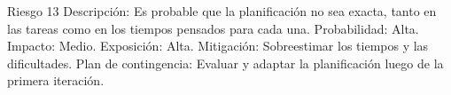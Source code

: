 Riesgo 13
Descripción: Es probable que la planificación no sea exacta, tanto en las tareas como en los tiempos pensados para cada una.
Probabilidad: Alta.
Impacto: Medio.
Exposición: Alta.
Mitigación: Sobreestimar los tiempos y las dificultades.
Plan de contingencia: Evaluar y adaptar la planificación luego de la primera iteración.

